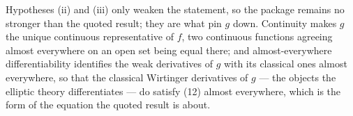 \begin{definition}
Hypotheses (ii) and (iii) only weaken the statement, so the package remains no
stronger than the quoted result; they are what pin $g$ down.  Continuity makes
$g$ the unique continuous representative of $f$, two continuous functions
agreeing almost everywhere on an open set being equal there; and
almost-everywhere differentiability identifies the weak derivatives of $g$
with its classical ones almost everywhere, so that the classical Wirtinger
derivatives of $g$ --- the objects the elliptic theory differentiates --- do
satisfy (12) almost everywhere, which is the form of the equation the quoted
result is about.
\end{definition}
